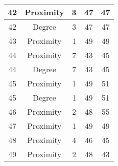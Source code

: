 \documentclass[results.tex]{subfiles}
\begin{document}
\begin{center}
\begin{tabular}{| c || c | c | c | c |}
            \hline
            42                      & Proximity                    & 3                      & 47                      & 47                   \\
            \hline
            42                      & Degree                       & 3                      & 47                      & 47                   \\
            \hline
            43                      & Proximity                    & 1                      & 49                      & 49                   \\
            \hline
            44                      & Proximity                    & 7                      & 43                      & 45                   \\
            \hline
            44                      & Degree                       & 7                      & 43                      & 45                   \\
            \hline
            45                      & Proximity                    & 1                      & 49                      & 51                   \\
            \hline
            45                      & Degree                       & 1                      & 49                      & 51                   \\
            \hline
            46                      & Proximity                    & 2                      & 48                      & 55                   \\
            \hline
            47                      & Proximity                    & 1                      & 49                      & 49                   \\
            \hline
            48                      & Proximity                    & 4                      & 46                      & 45                   \\
            \hline
            49                      & Proximity                    & 2                      & 48                      & 43                   \\
            \hline
        \end{tabular}
    \end{center}
\end{document}
